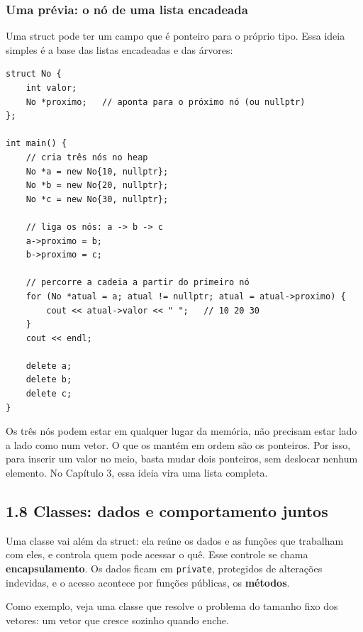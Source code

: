 \subsubsection{Uma prévia: o nó de uma lista encadeada}

Uma struct pode ter um campo que é ponteiro para o próprio tipo. Essa ideia simples é a base das listas encadeadas e das árvores:

\begin{codigo}
\begin{Verbatim}[breaklines=true, breaksymbolleft={}, fontsize=\footnotesize]
struct No {
    int valor;
    No *proximo;   // aponta para o próximo nó (ou nullptr)
};

int main() {
    // cria três nós no heap
    No *a = new No{10, nullptr};
    No *b = new No{20, nullptr};
    No *c = new No{30, nullptr};

    // liga os nós: a -> b -> c
    a->proximo = b;
    b->proximo = c;

    // percorre a cadeia a partir do primeiro nó
    for (No *atual = a; atual != nullptr; atual = atual->proximo) {
        cout << atual->valor << " ";   // 10 20 30
    }
    cout << endl;

    delete a;
    delete b;
    delete c;
}
\end{Verbatim}
\end{codigo}

Os três nós podem estar em qualquer lugar da memória, não precisam estar lado a lado como num vetor. O que os mantém em ordem são os ponteiros. Por isso, para inserir um valor no meio, basta mudar dois ponteiros, sem deslocar nenhum elemento. No Capítulo 3, essa ideia vira uma lista completa.

\subsection{1.8 Classes: dados e comportamento juntos}

Uma classe vai além da struct: ela reúne os dados e as funções que trabalham com eles, e controla quem pode acessar o quê. Esse controle se chama \textbf{encapsulamento}. Os dados ficam em \texttt{private}, protegidos de alterações indevidas, e o acesso acontece por funções públicas, os \textbf{métodos}.

Como exemplo, veja uma classe que resolve o problema do tamanho fixo dos vetores: um vetor que cresce sozinho quando enche.

